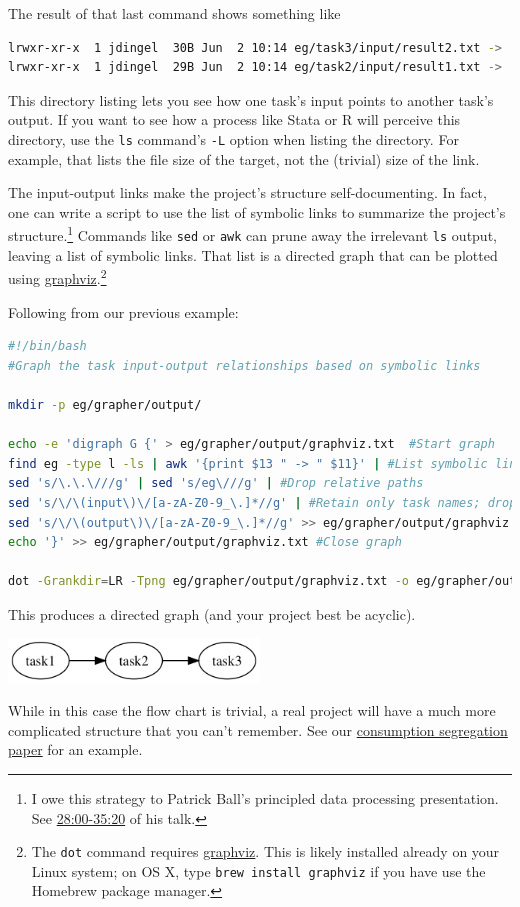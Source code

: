 The result of that last command shows something like
\begin{lstlisting}[language=bash]
lrwxr-xr-x  1 jdingel  30B Jun  2 10:14 eg/task3/input/result2.txt -> ../../task2/output/result2.txt
lrwxr-xr-x  1 jdingel  29B Jun  2 10:14 eg/task2/input/result1.txt -> ../../task1/output/result.txt
\end{lstlisting}
This directory listing lets you see how one task's input points to another task's output.
If you want to see how a process like Stata or R will perceive this directory,
use the \texttt{ls} command's \texttt{-L} option when listing the directory.
For example, that lists the file size of the target, not the (trivial) size of the link.

The input-output links make the project's structure self-documenting.
In fact, one can write a script to use the list of symbolic links to summarize the project's structure.\footnote{
	I owe this strategy to Patrick Ball's principled data processing presentation.
	See \href{https://www.youtube.com/watch?v=ZSunU9GQdcI&t=28m00s}{28:00-35:20} of his talk.
}
Commands like \texttt{sed} or \texttt{awk} can prune away the irrelevant \texttt{ls} output,
leaving a list of symbolic links.
That list is a directed graph that can be plotted using \href{https://en.wikipedia.org/wiki/Graphviz}{graphviz}.\footnote{
	The \texttt{dot} command requires \href{https://www.graphviz.org/}{graphviz}.
	This is likely installed already on your Linux system;
	on OS X, type \texttt{brew install graphviz} if you have use the Homebrew package manager.
}

Following from our previous example:
\begin{lstlisting}[language=bash]
#!/bin/bash
#Graph the task input-output relationships based on symbolic links

mkdir -p eg/grapher/output/

echo -e 'digraph G {' > eg/grapher/output/graphviz.txt  #Start graph
find eg -type l -ls | awk '{print $13 " -> " $11}' | #List symbolic links
sed 's/\.\.\///g' | sed 's/eg\///g' | #Drop relative paths
sed 's/\/\(input\)\/[a-zA-Z0-9_\.]*//g' | #Retain only task names; drop filenames
sed 's/\/\(output\)\/[a-zA-Z0-9_\.]*//g' >> eg/grapher/output/graphviz.txt #Ditto; write to file
echo '}' >> eg/grapher/output/graphviz.txt #Close graph

dot -Grankdir=LR -Tpng eg/grapher/output/graphviz.txt -o eg/grapher/output/task_flow.png
\end{lstlisting}
This produces a directed graph (and your project best be acyclic).
\begin{center}
\includegraphics[width=0.5\textwidth]{./figures/workflow/tasks_flow_graph_trivialexample.png}
\end{center}
While in this case the flow chart is trivial, a real project will have a much more complicated structure that you can't remember.
See our \href{https://github.com/jdingel/DavisDingelMonrasMorales}{consumption segregation paper} for an example.

